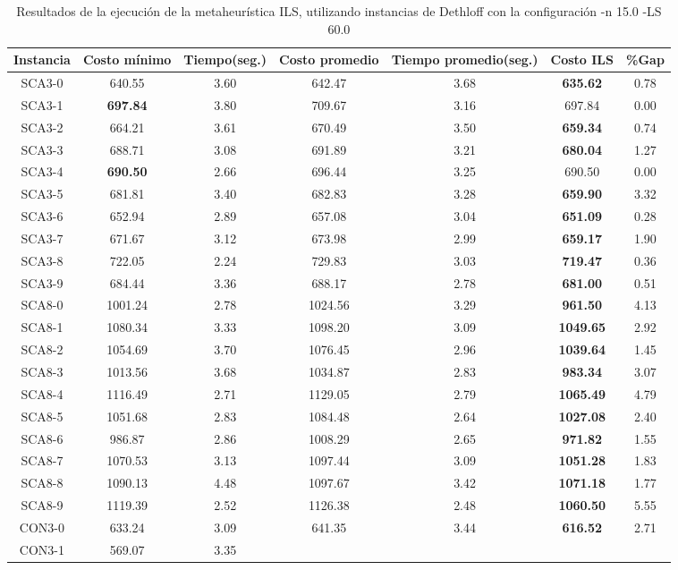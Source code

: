 \begin{table}[ht]
\caption{Resultados de la ejecución de la metaheurística ILS, utilizando instancias de Dethloff con la configuración -n 15.0 -LS 60.0}
\centering
\small
\begin{tabular}{c c c c c c c}
\hline\hline
Instancia & Costo mínimo & Tiempo(seg.) & Costo promedio & Tiempo promedio(seg.) & Costo ILS & \%Gap \\ [0.5ex]
\hline
SCA3-0 & 640.55 & 3.60 & 
642.47 & 3.68 & \bf{635.62} & 
0.78\\SCA3-1 & \bf{697.84} & 3.80 & 
709.67 & 3.16 & 697.84 & 0.00\\
SCA3-2 & 664.21 & 3.61 & 
670.49 & 3.50 & \bf{659.34} & 
0.74\\SCA3-3 & 688.71 & 3.08 & 
691.89 & 3.21 & \bf{680.04} & 
1.27\\SCA3-4 & \bf{690.50} & 2.66 & 
696.44 & 3.25 & 690.50 & 0.00\\
SCA3-5 & 681.81 & 3.40 & 
682.83 & 3.28 & \bf{659.90} & 
3.32\\SCA3-6 & 652.94 & 2.89 & 
657.08 & 3.04 & \bf{651.09} & 
0.28\\SCA3-7 & 671.67 & 3.12 & 
673.98 & 2.99 & \bf{659.17} & 
1.90\\SCA3-8 & 722.05 & 2.24 & 
729.83 & 3.03 & \bf{719.47} & 
0.36\\SCA3-9 & 684.44 & 3.36 & 
688.17 & 2.78 & \bf{681.00} & 
0.51\\SCA8-0 & 1001.24 & 2.78 & 
1024.56 & 3.29 & \bf{961.50} & 
4.13\\SCA8-1 & 1080.34 & 3.33 & 
1098.20 & 3.09 & \bf{1049.65} & 
2.92\\SCA8-2 & 1054.69 & 3.70 & 
1076.45 & 2.96 & \bf{1039.64} & 
1.45\\SCA8-3 & 1013.56 & 3.68 & 
1034.87 & 2.83 & \bf{983.34} & 
3.07\\SCA8-4 & 1116.49 & 2.71 & 
1129.05 & 2.79 & \bf{1065.49} & 
4.79\\SCA8-5 & 1051.68 & 2.83 & 
1084.48 & 2.64 & \bf{1027.08} & 
2.40\\SCA8-6 & 986.87 & 2.86 & 
1008.29 & 2.65 & \bf{971.82} & 
1.55\\SCA8-7 & 1070.53 & 3.13 & 
1097.44 & 3.09 & \bf{1051.28} & 
1.83\\SCA8-8 & 1090.13 & 4.48 & 
1097.67 & 3.42 & \bf{1071.18} & 
1.77\\SCA8-9 & 1119.39 & 2.52 & 
1126.38 & 2.48 & \bf{1060.50} & 
5.55\\CON3-0 & 633.24 & 3.09 & 
641.35 & 3.44 & \bf{616.52} & 
2.71\\CON3-1 & 569.07 & 3.35 & 

\end{tabular}
\end{table}
